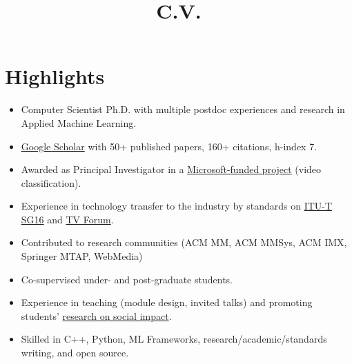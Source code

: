 \documentclass[10pt,a4paper,sans,colorlinks]{moderncv}
\title{C.V.}
\newcommand\setHyperrefBlueLinks{
  \definecolor{links}{HTML}{2A1B81}
  \hypersetup{
    urlcolor=links,
    linkcolor=links,
    citecolor=links
  }
}
\begin{document}
\setHyperrefBlueLinks
\makecvtitle
\vspace{-2em}

\section{Highlights}

\begin{itemize}
  \item Computer Scientist Ph.D. with multiple postdoc experiences and research in Applied Machine Learning.
  \item \href{https://scholar.google.com/citations?user=1bEOmkUAAAAJ&hl=en}{Google Scholar} with 50+ published papers, 160+ citations, h-index 7.
  \item Awarded  as Principal Investigator in a \href{https://www.rnp.br/en/rnp-and-microsoft-challenge-artificial-intelligence}{Microsoft-funded project} (video classification).
  \item Experience in technology transfer to the industry by standards on \href{http://www.itu.int/en/ITU-T/studygroups/2022-2024/16}{ITU-T SG16} and \href{http://forumsbtvd.org.br}{TV Forum}.
  \item Contributed to research communities (ACM MM, ACM MMSys, ACM IMX, Springer MTAP, WebMedia)
  \item Co-supervised under- and post-graduate students.
  \item Experience in teaching  (module design, invited talks) and promoting students' \href{https://webmedia.org.br/2022/en/lf-award/}{research on social impact}.
  \item Skilled in C++, Python, ML Frameworks, research/academic/standards writing, and open source.
\end{itemize}


\end{document}
